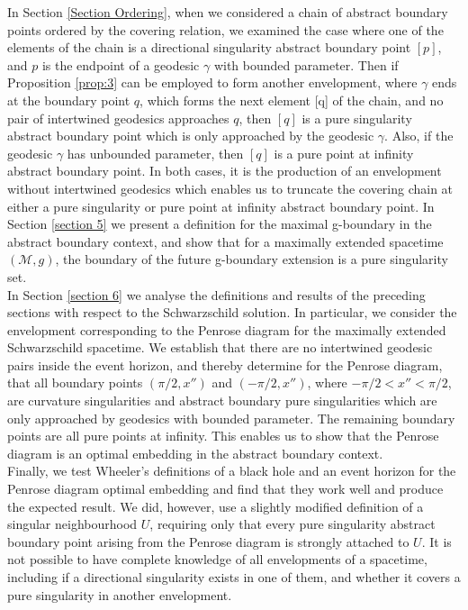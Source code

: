\documentclass[pdflatex,sn-mathphys-num]{sn-jnl}
\theoremstyle{definition}
\begin{document}
In Section \ref{Section Ordering}, when we considered a chain of abstract boundary points ordered by the covering relation, we examined the case where one of the elements of the chain is a directional singularity abstract boundary point $[p]$, and $p$ is the endpoint of a geodesic $\gamma$ with bounded parameter. Then if Proposition \ref{prop:3} can be employed to form another envelopment, where $\gamma$ ends at the boundary point $q$, which forms the next element [q] of the chain, and no pair of intertwined geodesics approaches $q$, then $[q]$ is a pure singularity abstract boundary point which is only approached by the geodesic $\gamma$. Also, if the geodesic $\gamma$ has unbounded parameter, then $[q]$ is a pure point at infinity abstract boundary point. In both cases, it is the production of an envelopment without intertwined geodesics which enables us to truncate the covering chain at either a pure singularity or pure point at infinity abstract boundary point. In Section \ref{section 5} we present a definition for the maximal g-boundary in the abstract boundary context, and show that for a maximally extended spacetime $(\mathcal{M},g)$, the boundary of the future g-boundary extension is a pure singularity set.\\

In Section \ref{section 6} we analyse the definitions and results of the preceding sections with respect to the Schwarzschild solution. In particular, we consider the envelopment corresponding to the Penrose diagram for the maximally extended Schwarzschild spacetime. We establish that there are no intertwined geodesic pairs inside the event horizon, and thereby determine for the Penrose diagram, that all boundary points $(\pi/2,x'')$ and $(-\pi/2,x'')$, where $-\pi/2<x''<\pi/2$, are curvature singularities and abstract boundary pure singularities which are only approached by geodesics with bounded parameter. The remaining boundary points are all pure points at infinity. This enables us to show that the Penrose diagram is an optimal embedding in the abstract boundary context.\\

Finally, we test Wheeler's definitions of a black hole and an event horizon for the Penrose diagram optimal embedding and find that they work well and produce the expected result. We did, however, use a slightly modified definition of a singular neighbourhood $U$, requiring only that every pure singularity abstract boundary point arising from the Penrose diagram is strongly attached to $U$. It is not possible to have complete knowledge of all envelopments of a spacetime, including if a directional singularity exists in one of them, and whether it covers a pure singularity in another envelopment.\\
\end{document}
